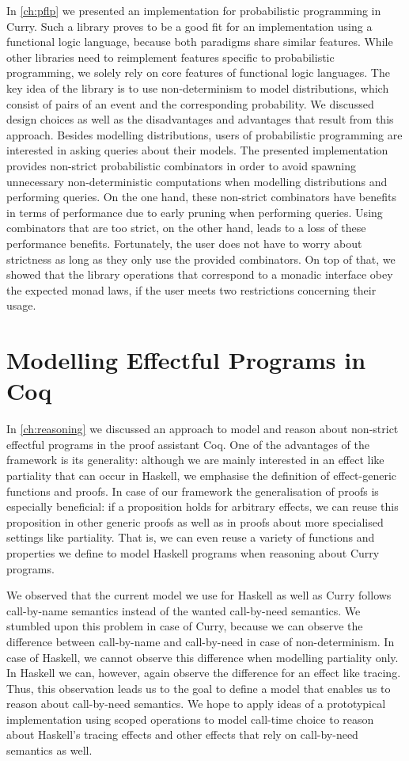 In \autoref{ch:pflp} we presented an implementation for probabilistic programming in Curry.
Such a library proves to be a good fit for an implementation using a functional logic language, because both paradigms share similar features.
While other libraries need to reimplement features specific to probabilistic programming, we solely rely on core features of functional logic languages.
The key idea of the library is to use non\--determinism to model distributions, which consist of pairs of an event and the corresponding probability.
We discussed design choices as well as the disadvantages and advantages that result from this approach.
Besides modelling distributions, users of probabilistic programming are interested in asking queries about their models.
The presented implementation provides non\--strict probabilistic combinators in order to avoid spawning unnecessary non\--deterministic computations when modelling distributions and performing queries.
On the one hand, these non\--strict combinators have benefits in terms of performance due to early pruning when performing queries.
Using combinators that are too strict, on the other hand, leads to a loss of these performance benefits.
Fortunately, the user does not have to worry about strictness as long as they only use the provided combinators.
On top of that, we showed that the library operations that correspond to a monadic interface obey the expected monad laws, if the user meets two restrictions concerning their usage.

\section{Modelling Effectful Programs in Coq}

In \autoref{ch:reasoning} we discussed an approach to model and reason about non\--strict effectful programs in the proof assistant Coq.
One of the advantages of the framework is its generality: although we are mainly interested in an effect like partiality that can occur in Haskell, we emphasise the definition of effect\--generic functions and proofs.
In case of our framework the generalisation of proofs is especially beneficial: if a proposition holds for arbitrary effects, we can reuse this proposition in other generic proofs as well as in proofs about more specialised settings like partiality.
That is, we can even reuse a variety of functions and properties we define to model Haskell programs when reasoning about Curry programs.

We observed that the current model we use for Haskell as well as Curry follows call\--by\--name semantics instead of the wanted call\--by\--need semantics.
We stumbled upon this problem in case of Curry, because we can observe the difference between call\--by\--name and call\--by\--need in case of non\--determinism.
In case of Haskell, we cannot observe this difference when modelling partiality only.
In Haskell we can, however, again observe the difference for an effect like tracing.
Thus, this observation leads us to the goal to define a model that enables us to reason about call\--by\--need semantics.
We hope to apply ideas of a prototypical implementation using scoped operations to model call\--time choice to reason about Haskell's tracing effects and other effects that rely on call\--by\--need semantics as well.
